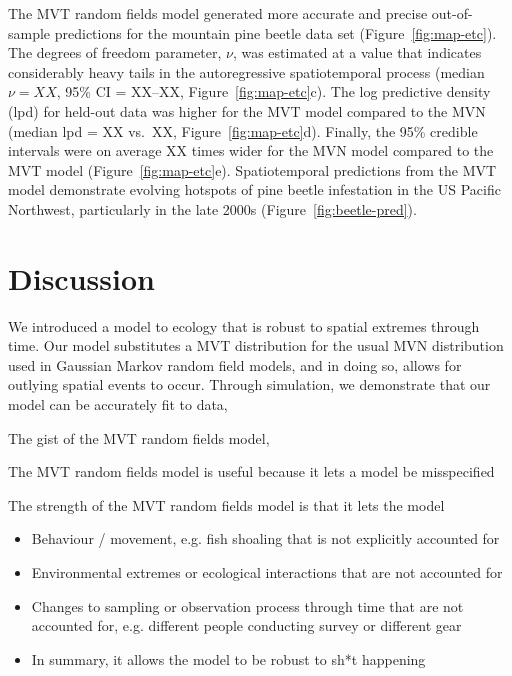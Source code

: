 \documentclass[12pt,english]{article}
\begin{document}
\begin{spacing}{1.3}
The MVT random fields model generated more accurate and precise out-of-sample
predictions for the mountain pine beetle data set (Figure~\ref{fig:map-etc}).
The degrees of freedom parameter, $\nu$, was estimated at a value that
indicates considerably heavy tails in the autoregressive spatiotemporal process
(median $\nu = XX$, 95\% CI = XX--XX, Figure~\ref{fig:map-etc}c). The log
predictive density (lpd) for held-out data was higher for the MVT model
compared to the MVN (median lpd = XX vs.\ XX, Figure~\ref{fig:map-etc}d).
Finally, the 95\% credible intervals were on average XX times wider for the MVN
model compared to the MVT model (Figure~\ref{fig:map-etc}e). Spatiotemporal
predictions from the MVT model demonstrate evolving hotspots of pine beetle
infestation in the US Pacific Northwest, particularly in the late 2000s
(Figure~\ref{fig:beetle-pred}).

\section{Discussion}

We introduced a model to ecology that is robust to spatial extremes through
time. Our model substitutes a MVT distribution for the usual MVN distribution
used in Gaussian Markov random field models, and in doing so, allows for
outlying spatial events to occur. Through simulation, we demonstrate that our
model can be accurately fit to data,

The gist of the MVT random fields model, 

The MVT random fields model is useful because it lets a model be misspecified

The strength of the MVT random fields model is that it lets the model 

\begin{itemize}

  \item Behaviour / movement, e.g. fish shoaling that is not explicitly
    accounted for 

  \item Environmental extremes or ecological interactions that are not accounted
    for

  \item Changes to sampling or observation process through time that are not
    accounted for, e.g. different people conducting survey or different gear

  \item In summary, it allows the model to be robust to sh*t happening


\end{itemize}
\end{spacing}
\end{document}
